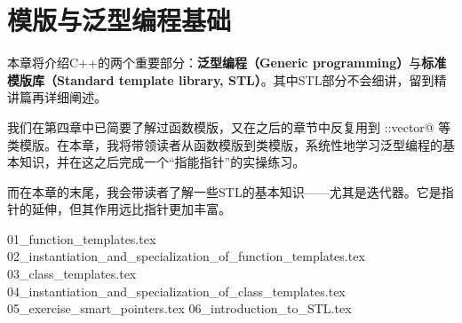 \chapter{模版与泛型编程基础}
本章将介绍C++的两个重要部分：\textbf{泛型编程（Generic programming）}与\textbf{标准模版库（Standard template library, STL）}。其中STL部分不会细讲，留到精讲篇再详细阐述。\par
我们在第四章中已简要了解过函数模版，又在之后的章节中反复用到 \lstinline@std::vector@ 等类模版。在本章，我将带领读者从函数模版到类模版，系统性地学习泛型编程的基本知识，并在这之后完成一个``指能指针''的实操练习。\par
而在本章的末尾，我会带读者了解一些STL的基本知识——尤其是迭代器。它是指针的延伸，但其作用远比指针更加丰富。\par
{01_function_templates.tex}
{02_instantiation_and_specialization_of_function_templates.tex}
{03_class_templates.tex}
{04_instantiation_and_specialization_of_class_templates.tex}
{05_exercise_smart_pointers.tex}
{06_introduction_to_STL.tex}